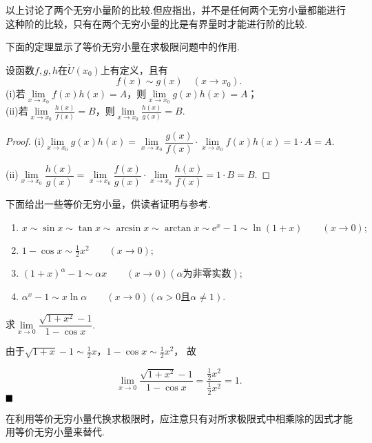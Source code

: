以上讨论了两个无穷小量阶的比较.但应指出，并不是任何两个无穷小量都能进行这种阶的比较，只有在两个无穷小量的比是有界量时才能进行阶的比较.

下面的定理显示了等价无穷小量在求极限问题中的作用.
\begin{theorem}
	设函数$f,g,h$在$\mathring{U}(x_0)$上有定义，且有
	$$f(x)\sim g(x)\quad (x\to x_0).$$
	(i)若$\lim\limits_{x\to x_0}f(x)h(x)=A$，则$\lim\limits_{x\to x_0}g(x)h(x)=A$；\\
	(ii)若$\lim\limits_{x\to x_0}\frac{h(x)}{f(x)}=B$，则$\lim\limits_{x\to x_0}\frac{h(x)}{g(x)}=B$.
\end{theorem}
\begin{proof}
	(i)$\lim\limits_{x\to x_0}g(x)h(x)=\lim\limits_{x\to x_0}\dfrac{g(x)}{f(x)}\cdot \lim\limits_{x\to x_0}f(x)h(x)=1\cdot A=A.$
	
	\hspace*{\fill}
	
	(ii)$\lim\limits_{x\to x_0}\dfrac{h(x)}{g(x)}=\lim\limits_{x\to x_0}\dfrac{f(x)}{g(x)}\cdot \lim\limits_{x\to x_0}\dfrac{h(x)}{f(x)}=1\cdot B=B.$
\end{proof}

\hspace*{\fill}

下面给出一些等价无穷小量，供读者证明与参考.
\begin{enumerate}
	\item $x\sim \sin x\sim \tan x\sim \arcsin x\sim \arctan x\sim \text{e}^x-1\sim \ln (1+x)\qquad(x\to 0);$
	\item $1-\cos x\sim \frac{1}{2}x^2\qquad(x\to 0);$
	\item $(1+x)^\alpha-1\sim \alpha x\qquad(x\to 0)(\alpha\text{为非零实数});$
	\item $\alpha^x-1\sim x\ln \alpha\qquad(x\to 0)(\alpha>0\text{且}\alpha\neq 1).$
\end{enumerate}

\hspace*{\fill}

\begin{example}
	求$\lim\limits_{x\to 0}\dfrac{\sqrt{1+x^2}-1}{1-\cos x}.$
\end{example}

\hspace*{\fill}

\begin{solution}
	由于$\sqrt{1+x}-1\sim \frac{1}{2}x$，$1-\cos x\sim \frac{1}{2}x^2$，
	故
	
	\hspace*{\fill}
	$$\lim\limits_{x\to 0}\frac{\sqrt{1+x^2}-1}{1-\cos x}=\dfrac{\frac{1}{2}x^2}{\frac{1}{2}x^2}=1.$$
	$\hfill\blacksquare$
\end{solution}
\begin{remark}
	在利用等价无穷小量代换求极限时，应注意只有对所求极限式中相乘除的因式才能用等价无穷小量来替代.
\end{remark}
